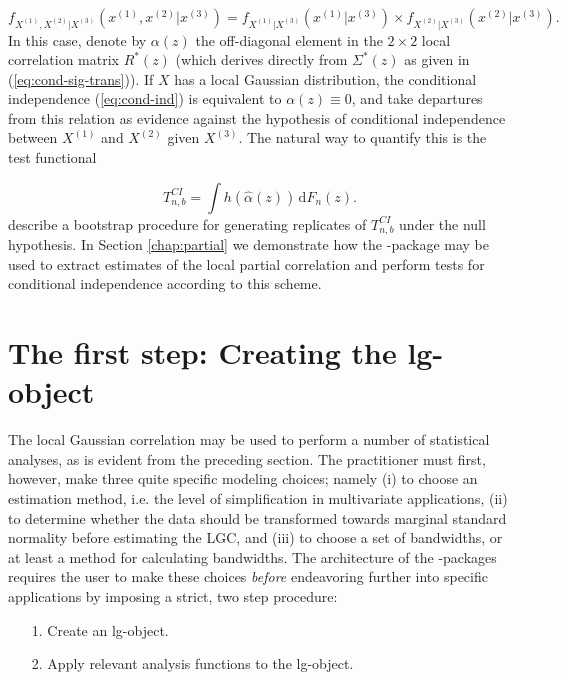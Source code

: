 \begin{equation}
f_{X^{(1)},X^{(2)}|X^{(3)}}\left(x^{(1)}, x^{(2)}|x^{(3)}\right) = f_{X^{(1)}|X^{(3)}}\left(x^{(1)}|x^{(3)}\right) \times f_{X^{(2)}|X^{(3)}}\left(x^{(2)}|x^{(3)}\right).
\label{eq:cond-ind}
\end{equation}
In this case, denote by $\alpha(z)$ the off-diagonal element in the $2\times2$ local correlation matrix $R^*(z)$ (which derives directly from $\Sigma^*(z)$ as given in (\ref{eq:cond-sig-trans})). If $X$ has a local Gaussian distribution, the conditional independence (\ref{eq:cond-ind}) is equivalent to $\alpha(z) \equiv 0$, and \citet{otne:tjos:2019} take departures from this relation as evidence against the hypothesis of conditional independence between $X^{(1)}$ and $X^{(2)}$ given $X^{(3)}$. The natural way to quantify this is the test functional

\begin{equation}
T^{CI}_{n, b} = \int h(\widehat\alpha(z)) \, \textrm{d}F_n(z).
\label{eq:ci-test-statistic}
\end{equation}
\citet{otne:tjos:2019} describe a bootstrap procedure for generating replicates of $T_{n,b}^{CI}$ under the null hypothesis. In Section \ref{chap:partial} we demonstrate how the -package may be used to extract estimates of the local partial correlation and perform tests for conditional independence according to this scheme.

\section{The first step: Creating the lg-object} 
\label{chap:lgobject}

The local Gaussian correlation may be used to perform a number of statistical analyses, as is evident from the preceding section. The practitioner must first, however, make three quite specific modeling choices; namely (i) to choose an estimation method, i.e. the level of simplification in multivariate applications, (ii) to determine whether the data should be transformed towards marginal standard normality before estimating the LGC, and (iii) to choose a set of bandwidths, or at least a method for calculating bandwidths. The architecture of the -packages requires the user to make these choices \emph{before} endeavoring further into specific applications by imposing a strict, two step procedure:

\begin{itemize}
\item[1.] Create an lg-object.
\item[2.] Apply relevant analysis functions to the lg-object.
\end{itemize}

